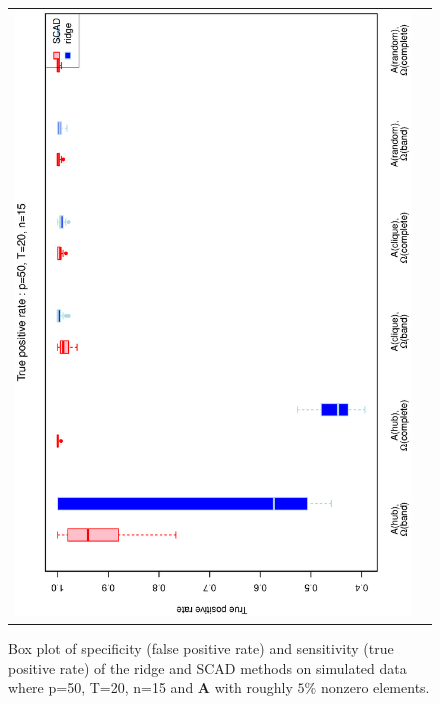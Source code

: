 \begin{figure}[h!]
\begin{tabular}{cc}
\includegraphics[scale=0.45,angle=270]{ROCtpr50T20N15_5.eps}
\end{tabular}
\caption{Box plot of specificity (false positive rate) and sensitivity (true positive rate) of the ridge and SCAD methods on simulated data where p=50, T=20,  n=15 and $\mathbf{A}$ with roughly $5\%$ nonzero elements.}
\label{figSM:RocP50T20N15_5}
\end{figure}
\clearpage

 
